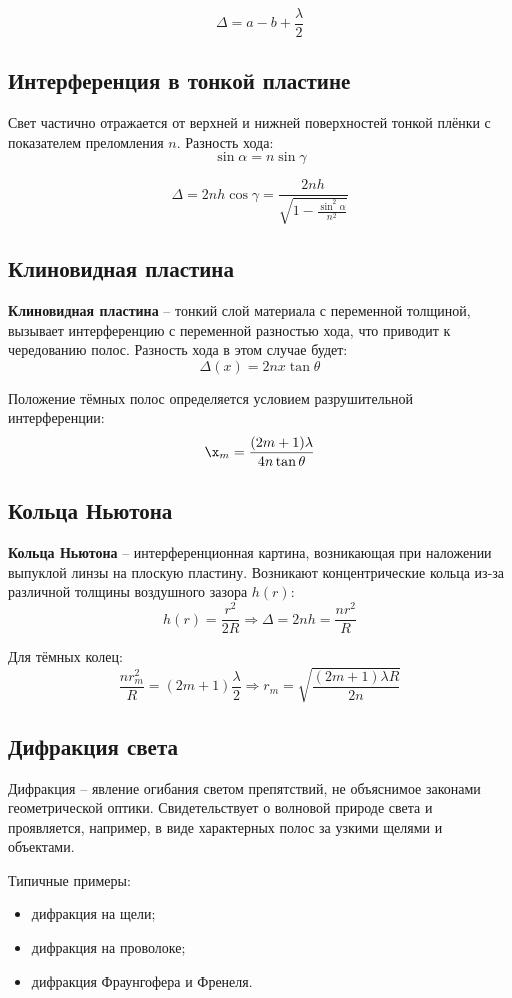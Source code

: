 \documentclass[12pt]{article}
\begin{document}
\[
\Delta = a - b + \frac{\lambda}{2}
\]

\subsection{Интерференция в тонкой пластине}

Свет частично отражается от верхней и нижней поверхностей тонкой плёнки с показателем преломления $n$. Разность хода:
\[
\sin \alpha = n \sin \gamma
\]

\[
\Delta = 2nh\cos \gamma = \frac{2nh}{\sqrt{1 - \frac{\sin^2 \alpha}{n^2}}}
\]

\subsection{Клиновидная пластина}

\textbf{Клиновидная пластина} -- тонкий слой материала с переменной толщиной, вызывает интерференцию с переменной разностью хода, что приводит к чередованию полос. Разность хода в этом случае будет:
\[
\Delta(x) = 2n x \tan \theta
\]

Положение тёмных полос определяется условием разрушительной интерференции:
\[
\x_m = \frac{(2m + 1)\lambda}{4n \tan \theta}
\]

\subsection{Кольца Ньютона}

\textbf{Кольца Ньютона} -- интерференционная картина, возникающая при наложении выпуклой линзы на плоскую пластину. Возникают концентрические кольца из-за различной толщины воздушного зазора $h(r)$:
\[
h(r) = \frac{r^2}{2R} \Rightarrow \Delta = 2n h = \frac{n r^2}{R}
\]

Для тёмных колец:
\[
\frac{n r_m^2}{R} = (2m + 1)\frac{\lambda}{2} \Rightarrow r_m = \sqrt{\frac{(2m + 1)\lambda R}{2n}}
\]

\subsection{Дифракция света}

Дифракция -- явление огибания светом препятствий, не объяснимое законами геометрической оптики. Свидетельствует о волновой природе света и проявляется, например, в виде характерных полос за узкими щелями и объектами.

Типичные примеры:
\begin{itemize}
  \item дифракция на щели;
  \item дифракция на проволоке;
  \item дифракция Фраунгофера и Френеля.
\end{itemize}
\end{document}
